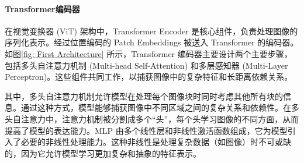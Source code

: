 \documentclass[a4paper]{ctexart}
\begin{document}
	\paragraph{Transformer编码器}
	
	在视觉变换器 (ViT) 架构中，Transformer Encoder 是核心组件，负责处理图像的序列化表示。经过位置编码的 Patch Embeddings 被送入 Transformer 的编码器。如图\ref{fig: First Architecture} 所示，Transformer 编码器主要设计两个主要步骤，包括多头自注意力机制 (Multi-head Self-Attention) 和多层感知器 (Multi-Layer Perceptron)。这些组件共同工作，以捕获图像中的复杂特征和长距离依赖关系。
	
	其中，多头自注意力机制允许模型在处理每个图像块时同时考虑其他所有块的信息。通过这种方式，模型能够捕获图像中不同区域之间的复杂关系和依赖性。在多头自注意力中，注意力机制被分割成多个“头”，每个头学习图像的不同方面，从而提高了模型的表达能力。MLP 由多个线性层和非线性激活函数组成，它为模型引入了必要的非线性处理能力。这种非线性是处理复杂数据（如图像）时不可或缺的，因为它允许模型学习更加复杂和抽象的特征表示。
	
%	
%		
%		
%		
%	
	
\end{document}
